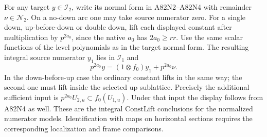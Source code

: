 For any target $y\in\mathcal I_2$, write its normal form in
A82N2--A82N4 with remainder $\nu\in\mathcal N_2$.
On a no-down arc one may take source numerator zero. For a
single down, up-before-down or double down, lift each displayed
constant after multiplication by $p^{2a_0}$, since the native
$a_0$ has $2a_0\ge rr$. Use the same scalar functions of the
level polynomials as in the target normal form. The resulting
integral source numerator $y_1$ lies in $\mathcal I_1$ and
\[
   p^{2a_0}y=(1\otimes f_0)y_1+p^{2a_0}\nu .
\]
In the down-before-up case the ordinary constant lifts in the same
way; the second one must lift inside the selected up sublattice.
Precisely the additional sufficient input is
$p^{2a_0}U_{2,u}\subset f_0(U_{1,u})$. Under that input the
display follows from A82N4 as well. These are the integral
$\mathrm{ConstLift}$ conclusions for the normalized numerator
models. Identification with maps on horizontal sections requires
the corresponding localization and frame comparisons.
